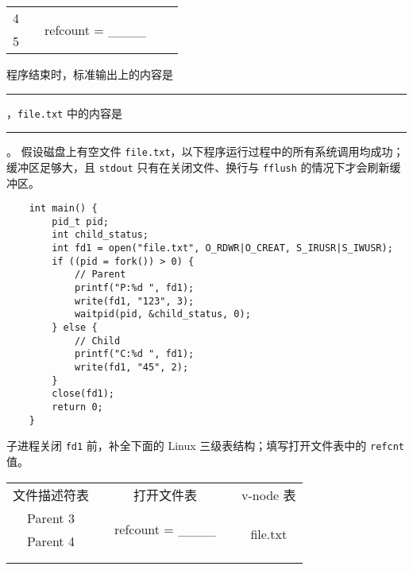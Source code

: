 \begin{problems}
\begin{table}[H]
\begin{tabular}{ccccc}
                \multicolumn{1}{|c|}{4} & \multicolumn{1}{c|}{} & \multicolumn{1}{c|}{\multirow{2}{*}{refcount = \_\_\_\_}} & \multicolumn{1}{c|}{} & \multicolumn{1}{c|}{} \\ \cline{1-1}
                \multicolumn{1}{|c|}{5} & \multicolumn{1}{c|}{} & \multicolumn{1}{c|}{} & \multicolumn{1}{c|}{} & \multicolumn{1}{c|}{} \\ \cline{1-1} \cline{3-3} \cline{5-5} 
            \end{tabular}
        \end{table}
        \qn 程序结束时，标准输出上的内容是 \rule{3.5cm}{0.25mm}，\verb|file.txt| 中的内容是 \rule{3.5cm}{0.25mm}。
        \pro 假设磁盘上有空文件 \verb|file.txt|，以下程序运行过程中的所有系统调用均成功；缓冲区足够大，且 \verb|stdout| 只有在关闭文件、换行与 \verb|fflush| 的情况下才会刷新缓冲区。
        \begin{verbatim}
    int main() {
        pid_t pid;
        int child_status;
        int fd1 = open("file.txt", O_RDWR|O_CREAT, S_IRUSR|S_IWUSR); 
        if ((pid = fork()) > 0) {
            // Parent
            printf("P:%d ", fd1);
            write(fd1, "123", 3);
            waitpid(pid, &child_status, 0);
        } else {
            // Child
            printf("C:%d ", fd1);
            write(fd1, "45", 2);
        } 
        close(fd1);
        return 0;
    }
        \end{verbatim}
        \qn 子进程关闭 \verb|fd1| 前，补全下面的 Linux 三级表结构；填写打开文件表中的 \verb|refcnt| 值。
        \begin{table}[H]
            \centering
            \begin{tabular}{ccccc}
                文件描述符表 & {\qquad \qquad \qquad} & 打开文件表 & {\qquad \qquad \qquad} & v-node 表 \\ \cline{1-1} \cline{3-3} \cline{5-5} 
                \multicolumn{1}{|c|}{Parent 3} & \multicolumn{1}{c|}{} & \multicolumn{1}{c|}{\multirow{2}{*}{refcount = \_\_\_\_}} & \multicolumn{1}{c|}{} & \multicolumn{1}{c|}{\multirow{6}{*}{file.txt}} \\ \cline{1-1}
                \multicolumn{1}{|c|}{Parent 4} & \multicolumn{1}{c|}{} & \multicolumn{1}{c|}{} & \multicolumn{1}{c|}{} & \multicolumn{1}{c|}{} \\ \cline{1-1} \cline{3-3}
                &  &  & \multicolumn{1}{c|}{} & \multicolumn{1}{c|}{} \\
                &  &  & \multicolumn{1}{c|}{} & \multicolumn{1}{c|}{} \\ \cline{1-1} \cline{3-3}

\end{tabular}
\end{table}
\end{problems}
